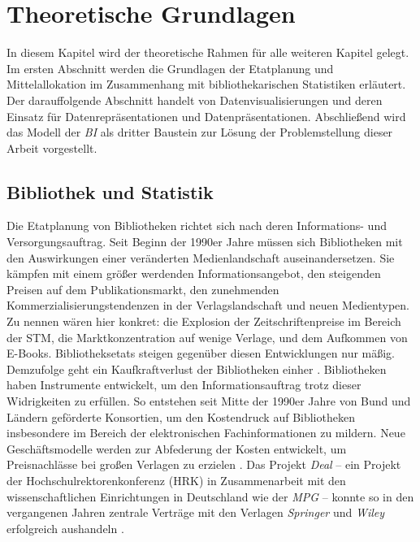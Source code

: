 \chapter{Theoretische Grundlagen}
\label{chap:two}
In diesem Kapitel wird der theoretische Rahmen für alle weiteren Kapitel gelegt. Im
ersten Abschnitt werden die Grundlagen der Etatplanung und Mittelallokation im Zusammenhang mit bibliothekarischen Statistiken erläutert. 
Der darauffolgende Abschnitt handelt von Datenvisualisierungen und deren Einsatz
für Datenrepräsentationen und Datenpräsentationen. Abschließend wird das Modell der \textit{\acrlong{BI}} als dritter Baustein zur Lösung der 
Problemstellung dieser Arbeit vorgestellt.

\section{Bibliothek und Statistik}
\label{chap:two_one}
Die Etatplanung von Bibliotheken richtet sich nach deren Informations- und Versorgungsauftrag. 
Seit Beginn der 1990er Jahre müssen sich Bibliotheken mit den Auswirkungen einer veränderten Medienlandschaft auseinandersetzen.
Sie kämpfen mit einem größer werdenden Informationsangebot, den steigenden Preisen auf dem Publikationsmarkt, 
den zunehmenden Kommerzialisierungstendenzen in der Verlagslandschaft und neuen Medientypen. 
Zu nennen wären hier konkret: die Explosion der Zeitschriftenpreise im Bereich der \acrfull{STM}, die Marktkonzentration auf wenige Verlage, 
und dem Aufkommen von E-Books. Bibliotheksetats steigen gegenüber diesen Entwicklungen nur mäßig. 
Demzufolge geht ein Kaufkraftverlust der Bibliotheken einher \cite[vgl.][S. 164 ff.]{moravetz-kuhlmann_monika_erwerbungspolitik_2015}.
Bibliotheken haben Instrumente entwickelt, um den Informationsauftrag trotz dieser Widrigkeiten zu erfüllen.
So entstehen seit Mitte der 1990er Jahre von Bund und Ländern geförderte Konsortien, um den Kostendruck auf Bibliotheken insbesondere im Bereich der elektronischen
Fachinformationen zu mildern. Neue Geschäftsmodelle werden zur Abfederung der Kosten entwickelt, um Preisnachlässe bei großen Verlagen zu erzielen
\cite[vgl.][S. 169 ff.]{moravetz-kuhlmann_monika_erwerbungspolitik_2015}. Das Projekt \textit{Deal} -- ein Projekt der Hochschulrektorenkonferenz (HRK) in Zusammenarbeit mit den
wissenschaftlichen Einrichtungen in Deutschland wie der \textit{\acrshort{MPG}} -- konnte so in den vergangenen Jahren zentrale Verträge mit den Verlagen \textit{Springer} und \textit{Wiley}
erfolgreich aushandeln \cite[vgl.][]{projekt_deal_projekt_2020}.

